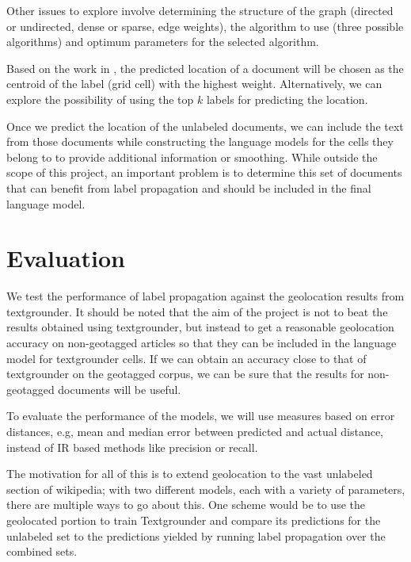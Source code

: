 \documentclass[11pt]{article}
\begin{document}
Other issues to explore involve determining the structure of the graph 
(directed or undirected, dense or sparse, edge weights), the algorithm to use 
(three possible algorithms) and optimum parameters for the selected algorithm. 

Based on the work in \cite{rolleretal:12}, the predicted location of a document will be chosen as the 
centroid of the label (grid cell) with the highest weight. Alternatively, we can explore the possibility of
using the top $k$ labels for predicting the location.

Once we predict the location of the unlabeled documents, 
we can include the text from those documents
while constructing the language models for the cells they belong to 
to provide additional information or smoothing.
While outside the scope of this project, an important problem is to determine this set of documents 
that can benefit from label propagation and should be included in the final language model.

\section{Evaluation}
We test the performance of label propagation against the geolocation results from textgrounder. 
It should be noted that the aim of the project is not to beat the results obtained using textgrounder,
but instead to get a reasonable geolocation accuracy on non-geotagged articles 
so that they can be included in the language model for textgrounder cells. 
If we can obtain an accuracy close to that of textgrounder on the geotagged corpus, 
we can be sure that the results for non-geotagged documents will be useful.


To evaluate the performance of the models, we will use measures based on error distances, 
e.g, mean and median error between predicted and actual distance,  
instead of IR based methods like precision or recall.

\par
The motivation for all of this is to extend geolocation to the vast unlabeled
section of wikipedia; with two different models, each with a variety of
parameters, there are multiple ways to go about this.
One scheme would be to use the geolocated portion to train Textgrounder and
compare its predictions for the unlabeled set to the predictions yielded by
running label propagation over the combined sets.



\end{document}
